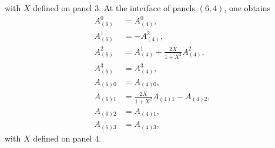 \documentclass{article}
\begin{document}
with $X$ defined on panel $3$. At the interface of panels $(6,4)$, one obtains
\begin{align}
A^0_{(6)}&=A^0_{(4)}, \\
A^1_{(6)}&=-A^2_{(4)}, \\
A^2_{(6)}&=A^1_{(4)} + \frac{2X}{1+X^2} A^2_{(4)}, \\
A^3_{(6)}&=A^3_{(4)}, \\
A_{(6)0}&=A_{(4)0}, \\
A_{(6)1}&=\frac{2X}{1+X^2} A_{(4)1} - A_{(4)2}, \\
A_{(6)2}&=A_{(4)1}, \\
A_{(6)3}&=A_{(4)3},
\end{align}
with $X$ defined on panel $4$.

\end{document}
